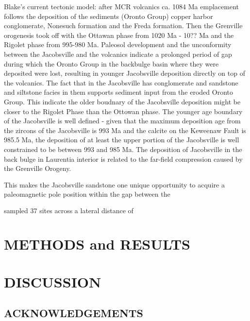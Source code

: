 \documentclass[11pt,letterpaper]{article}
\begin{document}
Blake's current tectonic model: after MCR volcanics ca. 1084 Ma emplacement follows the deposition of the sediments (Oronto Group) copper harbor conglomerate, Nonesuch formation and the Freda formation. Then the Grenville orogenesis took off with the Ottawan phase from 1020 Ma - 10?? Ma and the Rigolet phase from 995-980 Ma. Paleosol development and the unconformity between the Jacobsville and the volcanics indicate a prolonged period of gap during which the Oronto Group in the backbulge basin where they were deposited were lost, resulting in younger Jacobsville deposition directly on top of the volcanics. The fact that in the Jacobsville has conglomerate and sandstone and siltstone facies in them supports sediment input from the eroded Oronto Group. This indicate the older boudnary of the Jacobsville deposition might be closer to the Rigolet Phase than the Ottowan phase. The younger age boundary of the Jacobsville is well defined - given that the maximum deposition age from the zircons of the Jacobsville is 993 Ma and the calcite on the Keweenaw Fault is 985.5 Ma, the deposition of at least the upper portion of the Jacobsville is well constrained to be between 993 and 985 Ma. The deposition of Jacobsville in the back bulge in Laurentia interior is related to the far-field compression caused by the Grenville Orogeny. 

This makes the Jacobsville sandstone one unique opportunity to acquire a paleomagnetic pole position within the gap between the 

\cite{Roy1978a} sampled 37 sites across a lateral distance of 




\section*{METHODS and RESULTS}



\section*{DISCUSSION}





\subsection*{ACKNOWLEDGEMENTS}


\singlespacing
\clearpage


\end{document}

